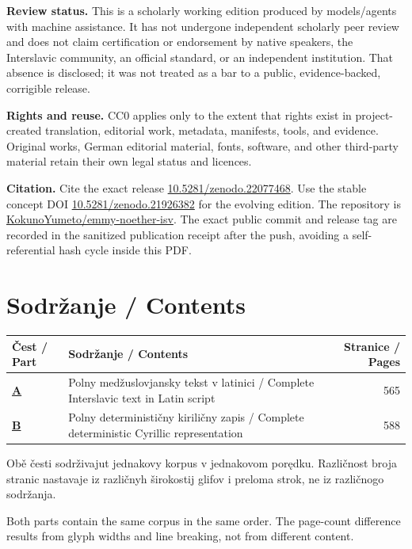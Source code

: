 \documentclass[11pt]{article}
\newcommand{\doiurl}[1]{\href{https://doi.org/#1}{#1}}
\newcommand{\repo}{\href{https://github.com/KokunoYumeto/emmy-noether-isv}{KokunoYumeto/emmy-noether-isv}}
\begin{document}
\textbf{Review status.} This is a scholarly working edition produced by models/agents with machine assistance. It has not undergone independent scholarly peer review and does not claim certification or endorsement by native speakers, the Interslavic community, an official standard, or an independent institution. That absence is disclosed; it was not treated as a bar to a public, evidence-backed, corrigible release.

\textbf{Rights and reuse.} CC0 applies only to the extent that rights exist in project-created translation, editorial work, metadata, manifests, tools, and evidence. Original works, German editorial material, fonts, software, and other third-party material retain their own legal status and licences.

\textbf{Citation.} Cite the exact release \doiurl{10.5281/zenodo.22077468}. Use the stable concept DOI \doiurl{10.5281/zenodo.21926382} for the evolving edition. The repository is \repo. The exact public commit and release tag are recorded in the sanitized publication receipt after the push, avoiding a self-referential hash cycle inside this PDF.
\clearpage

\section*{Sodržanje / Contents}
\begin{tabularx}{\textwidth}{@{}>{\bfseries}l X r@{}}
\toprule
Čest / Part & Sodržanje / Contents & Stranice / Pages\\
\midrule
\hyperref[part:latn]{A} & Polny medžuslovjansky tekst v latinici / Complete Interslavic text in Latin script & 565\\
\hyperref[part:cyrl]{B} & Polny determinističny kiriličny zapis / Complete deterministic Cyrillic representation & 588\\
\bottomrule
\end{tabularx}

\vspace{1.5em}
Obě česti sodrživajut jednakovy korpus v jednakovom porędku. Različnost broja stranic nastavaje iz različnyh širokostij glifov i preloma strok, ne iz različnogo sodržanja.

Both parts contain the same corpus in the same order. The page-count difference results from glyph widths and line breaking, not from different content.
\clearpage
\end{document}
